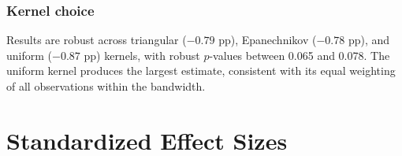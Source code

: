 \documentclass[12pt]{article}
\begin{document}
\subsubsection*{Kernel choice} Results are robust across triangular ($-0.79$ pp), Epanechnikov ($-0.78$ pp), and uniform ($-0.87$ pp) kernels, with robust $p$-values between 0.065 and 0.078. The uniform kernel produces the largest estimate, consistent with its equal weighting of all observations within the bandwidth.


\section{Standardized Effect Sizes}
\label{sec:sde}


\end{document}
